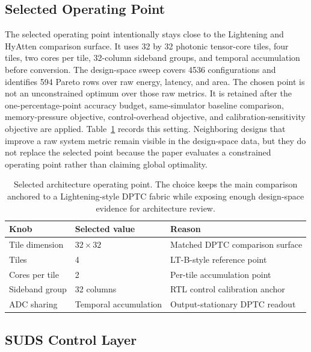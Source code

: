 \documentclass[10pt,journal]{IEEEtran}
\begin{document}
\subsection{Selected Operating Point}

The selected operating point intentionally stays close to the Lightening and
HyAtten comparison surface. It uses 32 by 32 photonic tensor-core tiles, four
tiles, two cores per tile, 32-column sideband groups, and temporal accumulation
before conversion. The design-space sweep covers 4536 configurations and
identifies 594 Pareto rows over raw energy, latency, and area. The chosen point
is not an unconstrained optimum over those raw metrics. It is retained after
the one-percentage-point accuracy budget, same-simulator baseline comparison,
memory-pressure objective, control-overhead objective, and
calibration-sensitivity objective are applied. Table~\ref{tab:operating-point}
records this setting. Neighboring designs that improve a raw system metric
remain visible in the design-space data, but they do not replace the selected
point because the paper evaluates a constrained operating point rather than
claiming global optimality.

\begin{table}[t]
\centering
\caption{Selected architecture operating point. The choice keeps the main
comparison anchored to a Lightening-style DPTC fabric while exposing enough
design-space evidence for architecture review.}
\label{tab:operating-point}
\footnotesize
\begin{tabular}{@{}p{}p{}p{}@{}}
\toprule
Knob & Selected value & Reason \\
\midrule
Tile dimension & \(32 \times 32\) & Matched DPTC comparison surface \\
Tiles & 4 & LT-B-style reference point \\
Cores per tile & 2 & Per-tile accumulation point \\
Sideband group & 32 columns & RTL control calibration anchor \\
ADC sharing & Temporal accumulation & Output-stationary DPTC readout \\
\bottomrule
\end{tabular}
\end{table}

\subsection{SUDS Control Layer}
\end{document}
